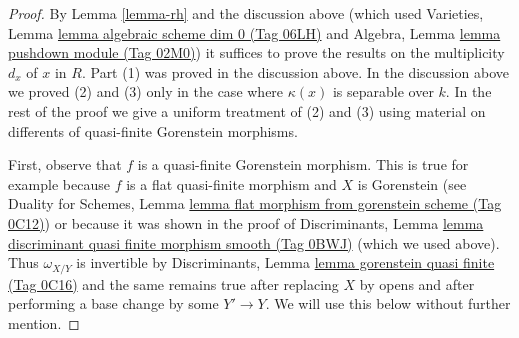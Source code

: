 \documentclass{amsart}
\theoremstyle{plain}
\theoremstyle{definition}
\theoremstyle{remark}
\numberwithin{equation}{subsection}
\begin{document}
\begin{proof}
By Lemma \ref{lemma-rh} and the discussion above
(which used
Varieties, Lemma \href{https://stacks.math.columbia.edu/tag/06LH}{lemma algebraic scheme dim 0 (Tag 06LH)}
and
Algebra, Lemma \href{https://stacks.math.columbia.edu/tag/02M0}{lemma pushdown module (Tag 02M0)})
it suffices to prove the results on the
multiplicity $d_x$ of $x$ in $R$. Part (1) was proved
in the discussion above. In the discussion above
we proved (2) and (3) only in the case where $\kappa(x)$ is
separable over $k$.
In the rest of the proof we give a uniform treatment
of (2) and (3) using material on differents of
quasi-finite Gorenstein morphisms.

\medskip\noindent
First, observe that $f$ is a quasi-finite Gorenstein morphism.
This is true for example because
$f$ is a flat quasi-finite morphism and $X$ is Gorenstein
(see Duality for Schemes, Lemma
\href{https://stacks.math.columbia.edu/tag/0C12}{lemma flat morphism from gorenstein scheme (Tag 0C12)})
or because it was shown in the proof of
Discriminants, Lemma
\href{https://stacks.math.columbia.edu/tag/0BWJ}{lemma discriminant quasi finite morphism smooth (Tag 0BWJ)}
(which we used above). Thus $\omega_{X/Y}$ is invertible by
Discriminants, Lemma \href{https://stacks.math.columbia.edu/tag/0C16}{lemma gorenstein quasi finite (Tag 0C16)}
and the same remains true after replacing $X$ by opens and after
performing a base change by some $Y' \to Y$. We will use this
below without further mention.


\end{proof}
\end{document}
